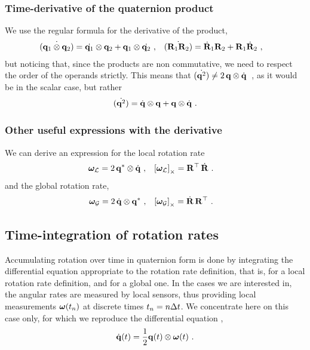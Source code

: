 \subsubsection{Time-derivative of the quaternion product}

We use the regular formula for the derivative of the product,
%
\begin{align}
\dot{({{\bf q}_1\otimes{\bf q}_2})} &= \dot{{\bf q}_1}\otimes{{\bf q}_2} + {\bf q}_1\otimes\dot{{{\bf q}_2}}~, 
&
\dot{({\bf R}_1{\bf R}_2)} &= \dot{{\bf R}}_1{\bf R}_2+{\bf R}_1\dot{{\bf R}}_2~,
\end{align}%
%
but noticing that, since the products are non commutative, we need to respect the order of the operands strictly.
This means that $\dot{({\bf q}^2)}\neq2\,{\bf q}\otimes\dot{{\bf q}}
$~, as it would be in the scalar case, but rather
%
\begin{align}
\dot{({\bf q}^2)} = \dot{{\bf q}}\otimes{\bf q} + {\bf q}\otimes\dot{{\bf q}} 
~.
\end{align}


\subsubsection{Other useful expressions with the derivative}

We can derive an expression for the local rotation rate
%
\begin{align}
{\bm \omega}_{\mathcal{L}} &= 2\,{\bf q}^*\otimes\dot{{\bf q}}~, 
&
\left[{\bm \omega}_{\mathcal{L}}\right]_\times &= {\bf R}^{\top}\,\dot{{\bf R}}~.
\end{align}%
%
and the global rotation rate,
%
\begin{align}
{\bm \omega}_{\mathcal{G}} &= 2\,\dot{{\bf q}}\otimes{\bf q}^*~, 
&
\left[{\bm \omega}_{\mathcal{G}}\right]_\times &= \dot{{\bf R}}\,{\bf R}^{\top}~.
\end{align}%




\subsection{Time-integration of rotation rates}

Accumulating rotation over time in quaternion form is done by integrating the differential equation appropriate to the rotation rate definition, that is,  for a local rotation rate definition, and  for a global one. 
In the cases we are interested in, the angular rates are measured by local sensors, thus providing local measurements ${\bm \omega}(t_n)$ at discrete times $t_n=n\Delta t$. 
We concentrate here on this case only, for which we reproduce the differential equation ,
%
\begin{align}
\dot{{\bf q}}(t) 
= \frac12{\bf q}(t)\otimes{\bm \omega}(t) 
~.
\label{equ:intLocal}
\end{align}

